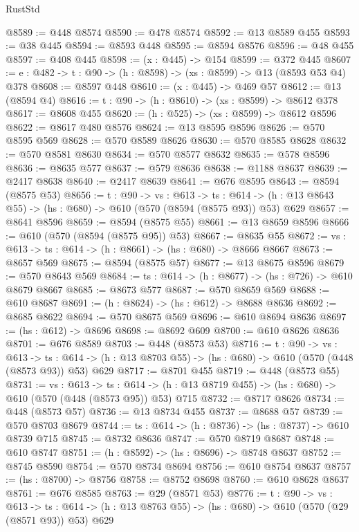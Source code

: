 \begin{lexlean}{RustStd}
\begin{coremodule}
@8589 := @448 @8574
@8590 := @478 @8574
@8592 := @13 @8589 @455
@8593 := @38 @445
@8594 := @8593 @448
@8595 := @8594 @8576
@8596 := @48 @455
@8597 := @408 @445
@8598 := (x : @445) -> @154
@8599 := @372 @445
@8607 := {e : @482} -> {t : @90} -> (h : @8598) -> (xs : @8599) -> @13 (@8593 @53 @4) @378
@8608 := @8597 @448
@8610 := (x : @445) -> @469 @57
@8612 := @13 (@8594 @4)
@8616 := {t : @90} -> (h : @8610) -> (xs : @8599) -> @8612 @378
@8617 := @8608 @455
@8620 := (h : @525) -> (xs : @8599) -> @8612 @8596
@8622 := @8617 @480 @8576
@8624 := @13 @8595 @8596
@8626 := @570 @8595 @569
@8628 := @570 @8589 @8626
@8630 := @570 @8585 @8628
@8632 := @570 @8581 @8630
@8634 := @570 @8577 @8632
@8635 := @578 @8596
@8636 := @8635 @577
@8637 := @579 @8636
@8638 := @1188 @8637
@8639 := @2417 @8638
@8640 := @2417 @8639
@8641 := @676 @8595
@8643 := @8594 (@8575 @53)
@8656 := {t : @90} ->
  {vs : @613} ->
  {ts : @614} -> (h : @13 @8643 @55) -> (hs : @680) -> @610 (@570 (@8594 (@8575 @93)) @53) @629
@8657 := @8641 @8596
@8659 := @8594 (@8575 @55)
@8661 := @13 @8659 @8596
@8666 := @610 (@570 (@8594 (@8575 @95)) @53)
@8667 := @8635 @55
@8672 := {vs : @613} -> {ts : @614} -> (h : @8661) -> (hs : @680) -> @8666 @8667
@8673 := @8657 @569
@8675 := @8594 (@8575 @57)
@8677 := @13 @8675 @8596
@8679 := @570 @8643 @569
@8684 := {ts : @614} -> (h : @8677) -> (hs : @726) -> @610 @8679 @8667
@8685 := @8673 @577
@8687 := @570 @8659 @569
@8688 := @610 @8687
@8691 := (h : @8624) -> (hs : @612) -> @8688 @8636
@8692 := @8685 @8622
@8694 := @570 @8675 @569
@8696 := @610 @8694 @8636
@8697 := (hs : @612) -> @8696
@8698 := @8692 @609
@8700 := @610 @8626 @8636
@8701 := @676 @8589
@8703 := @448 (@8573 @53)
@8716 := {t : @90} ->
  {vs : @613} ->
  {ts : @614} -> (h : @13 @8703 @55) -> (hs : @680) -> @610 (@570 (@448 (@8573 @93)) @53) @629
@8717 := @8701 @455
@8719 := @448 (@8573 @55)
@8731 := {vs : @613} ->
  {ts : @614} -> (h : @13 @8719 @455) -> (hs : @680) -> @610 (@570 (@448 (@8573 @95)) @53) @715
@8732 := @8717 @8626
@8734 := @448 (@8573 @57)
@8736 := @13 @8734 @455
@8737 := @8688 @57
@8739 := @570 @8703 @8679
@8744 := {ts : @614} -> (h : @8736) -> (hs : @8737) -> @610 @8739 @715
@8745 := @8732 @8636
@8747 := @570 @8719 @8687
@8748 := @610 @8747
@8751 := (h : @8592) -> (hs : @8696) -> @8748 @8637
@8752 := @8745 @8590
@8754 := @570 @8734 @8694
@8756 := @610 @8754 @8637
@8757 := (hs : @8700) -> @8756
@8758 := @8752 @8698
@8760 := @610 @8628 @8637
@8761 := @676 @8585
@8763 := @29 (@8571 @53)
@8776 := {t : @90} ->
  {vs : @613} ->
  {ts : @614} -> (h : @13 @8763 @55) -> (hs : @680) -> @610 (@570 (@29 (@8571 @93)) @53) @629

\end{coremodule}
\end{lexlean}
